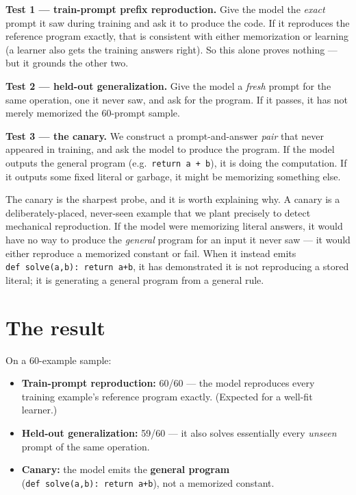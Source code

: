 \textbf{Test 1 --- train-prompt prefix reproduction.} Give the model the
\emph{exact} prompt it saw during training and ask it to produce the
code. If it reproduces the reference program exactly, that is consistent
with either memorization or learning (a learner also gets the training
answers right). So this alone proves nothing --- but it grounds the
other two.

\textbf{Test 2 --- held-out generalization.} Give the model a
\emph{fresh} prompt for the same operation, one it never saw, and ask
for the program. If it passes, it has not merely memorized the 60-prompt
sample.

\textbf{Test 3 --- the canary.} We construct a prompt-and-answer
\emph{pair} that never appeared in training, and ask the model to
produce the program. If the model outputs the general program
(e.g.~\texttt{return\ a\ +\ b}), it is doing the computation. If it
outputs some fixed literal or garbage, it might be memorizing something
else.

The canary is the sharpest probe, and it is worth explaining why. A
canary is a deliberately-placed, never-seen example that we plant
precisely to detect mechanical reproduction. If the model were
memorizing literal answers, it would have no way to produce the
\emph{general} program for an input it never saw --- it would either
reproduce a memorized constant or fail. When it instead emits
\texttt{def\ solve(a,b):\ return\ a+b}, it has demonstrated it is not
reproducing a stored literal; it is generating a general program from a
general rule.

\section{The result}\label{the-result}

On a 60-example sample:

\begin{itemize}
\tightlist
\item
  \textbf{Train-prompt reproduction:} 60/60 --- the model reproduces
  every training example's reference program exactly. (Expected for a
  well-fit learner.)
\item
  \textbf{Held-out generalization:} 59/60 --- it also solves essentially
  every \emph{unseen} prompt of the same operation.
\item
  \textbf{Canary:} the model emits the \textbf{general program}
  (\texttt{def\ solve(a,b):\ return\ a+b}), not a memorized constant.
\end{itemize}

